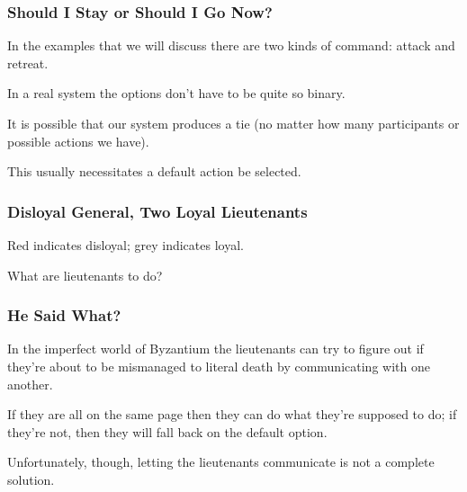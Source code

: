 \begin{frame}
	\frametitle{Should I Stay or Should I Go Now?}

	In the examples that we will discuss there are two kinds of command: attack and retreat.

	In a real system the options don't have to be quite so binary.

	It is possible that our system produces a tie (no matter how many participants or possible actions we have).

	This usually necessitates a default action be selected.

\end{frame}



\begin{frame}
	\frametitle{Disloyal General, Two Loyal Lieutenants}

	\begin{center}
	\end{center}

	Red indicates disloyal; grey indicates loyal.

	What are lieutenants to do?

\end{frame}


\begin{frame}
	\frametitle{He Said What?}

	In the imperfect world of Byzantium the lieutenants can try to figure out if they're about to be mismanaged to literal death by communicating with one another.

	If they are all on the same page then they can do what they're supposed to do; if they're not, then they will fall back on the default option.

	Unfortunately, though, letting the lieutenants communicate is not a complete solution.

\end{frame}


